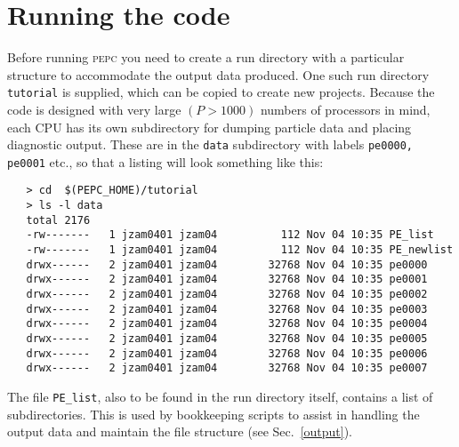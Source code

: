 \documentclass[12pt,psfig]{article}
\begin{document}
\section{Running the code}

Before running \textsc{pepc} you need to create a run directory with a
particular structure to accommodate the output data produced.  One such run
directory {\tt tutorial} is supplied, which can be copied to create new
projects. Because the
code is designed with very large $(P>1000)$ numbers of processors in mind,
each CPU has its own subdirectory for dumping particle data and placing
diagnostic output.  These are in the {\tt data} subdirectory with labels
{\tt pe0000, pe0001} etc., so that a listing will look something like this:
\begin{verbatim}
   > cd  $(PEPC_HOME)/tutorial
   > ls -l data
   total 2176
   -rw-------   1 jzam0401 jzam04          112 Nov 04 10:35 PE_list
   -rw-------   1 jzam0401 jzam04          112 Nov 04 10:35 PE_newlist
   drwx------   2 jzam0401 jzam04        32768 Nov 04 10:35 pe0000
   drwx------   2 jzam0401 jzam04        32768 Nov 04 10:35 pe0001
   drwx------   2 jzam0401 jzam04        32768 Nov 04 10:35 pe0002
   drwx------   2 jzam0401 jzam04        32768 Nov 04 10:35 pe0003
   drwx------   2 jzam0401 jzam04        32768 Nov 04 10:35 pe0004
   drwx------   2 jzam0401 jzam04        32768 Nov 04 10:35 pe0005
   drwx------   2 jzam0401 jzam04        32768 Nov 04 10:35 pe0006
   drwx------   2 jzam0401 jzam04        32768 Nov 04 10:35 pe0007
\end{verbatim}

\noindent 
The file {\tt PE\_list}, also to be found in the run directory itself, contains
a list of subdirectories.  This is used by bookkeeping scripts to assist in handling the
output data and maintain the file structure (see Sec.~\ref{output}).
 
\end{document}
